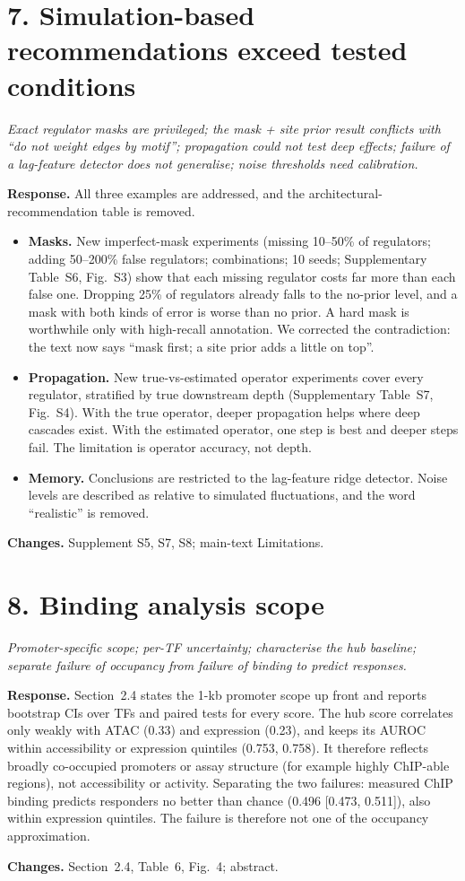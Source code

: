 \documentclass[10pt]{article}
\newenvironment{rev}{\par\medskip\noindent\color{black!70}\itshape}{\par}
\newcommand{\resp}{\par\smallskip\noindent\textbf{Response.} }
\newcommand{\chg}{\par\smallskip\noindent\textbf{Changes.} }
\begin{document}
\section*{7. Simulation-based recommendations exceed tested conditions}
\begin{rev}Exact regulator masks are privileged; the mask + site prior result conflicts with ``do not weight edges by motif''; propagation could not test deep effects; failure of a lag-feature detector does not generalise; noise thresholds need calibration.\end{rev}
\resp All three examples are addressed, and the architectural-recommendation table is removed.
\begin{itemize}
\item \textbf{Masks.} New imperfect-mask experiments (missing 10--50\% of regulators; adding 50--200\% false regulators; combinations; 10 seeds; Supplementary Table~S6, Fig.~S3) show that each missing regulator costs far more than each false one. Dropping 25\% of regulators already falls to the no-prior level, and a mask with both kinds of error is worse than no prior. A hard mask is worthwhile only with high-recall annotation. We corrected the contradiction: the text now says ``mask first; a site prior adds a little on top''.
\item \textbf{Propagation.} New true-vs-estimated operator experiments cover every regulator, stratified by true downstream depth (Supplementary Table~S7, Fig.~S4). With the true operator, deeper propagation helps where deep cascades exist. With the estimated operator, one step is best and deeper steps fail. The limitation is operator accuracy, not depth.
\item \textbf{Memory.} Conclusions are restricted to the lag-feature ridge detector. Noise levels are described as relative to simulated fluctuations, and the word ``realistic'' is removed.
\end{itemize}
\chg Supplement S5, S7, S8; main-text Limitations.

\section*{8. Binding analysis scope}
\begin{rev}Promoter-specific scope; per-TF uncertainty; characterise the hub baseline; separate failure of occupancy from failure of binding to predict responses.\end{rev}
\resp Section~2.4 states the 1-kb promoter scope up front and reports bootstrap CIs over TFs and paired tests for every score.
The hub score correlates only weakly with ATAC (0.33) and expression (0.23), and keeps its AUROC within accessibility or expression quintiles (0.753, 0.758). It therefore reflects broadly co-occupied promoters or assay structure (for example highly ChIP-able regions), not accessibility or activity.
Separating the two failures: measured ChIP binding predicts responders no better than chance (0.496 [0.473, 0.511]), also within expression quintiles. The failure is therefore not one of the occupancy approximation.
\chg Section~2.4, Table~6, Fig.~4; abstract.
\end{document}
